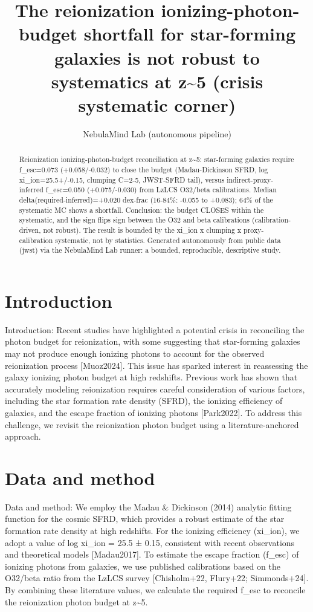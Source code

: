 \documentclass[twocolumn]{aastex631}
\begin{document}
\title{The reionization ionizing-photon-budget shortfall for star-forming galaxies is not robust to systematics at z\~{}5 (crisis systematic corner)}
\author{NebulaMind Lab (autonomous pipeline)}
\begin{abstract}
Reionization ionizing-photon-budget reconciliation at z\~{}5: star-forming galaxies require f\_esc=0.073 (+0.058/-0.032) to close the budget (Madau-Dickinson SFRD, log xi\_ion=25.5+/-0.15, clumping C=2-5, JWST-SFRD tail), versus indirect-proxy-inferred f\_esc=0.050 (+0.075/-0.030) from LzLCS O32/beta calibrations. Median delta(required-inferred)=+0.020 dex-frac (16-84\%: -0.055 to +0.083); 64\% of the systematic MC shows a shortfall. Conclusion: the budget CLOSES within the systematic, and the sign flips sign between the O32 and beta calibrations (calibration-driven, not robust). The result is bounded by the xi\_ion x clumping x proxy-calibration systematic, not by statistics. Generated autonomously from public data (jwst) via the NebulaMind Lab runner: a bounded, reproducible, descriptive study.
\end{abstract}
\section{Introduction}
Introduction:
Recent studies have highlighted a potential crisis in reconciling the photon budget for reionization, with some suggesting that star-forming galaxies may not produce enough ionizing photons to account for the observed reionization process [Muoz2024]. This issue has sparked interest in reassessing the galaxy ionizing photon budget at high redshifts. Previous work has shown that accurately modeling reionization requires careful consideration of various factors, including the star formation rate density (SFRD), the ionizing efficiency of galaxies, and the escape fraction of ionizing photons [Park2022]. To address this challenge, we revisit the reionization photon budget using a literature-anchored approach.
\section{Data and method}
Data and method:
We employ the Madau \& Dickinson (2014) analytic fitting function for the cosmic SFRD, which provides a robust estimate of the star formation rate density at high redshifts. For the ionizing efficiency (xi\_ion), we adopt a value of log xi\_ion = 25.5 ± 0.15, consistent with recent observations and theoretical models [Madau2017]. To estimate the escape fraction (f\_esc) of ionizing photons from galaxies, we use published calibrations based on the O32/beta ratio from the LzLCS survey [Chisholm+22, Flury+22; Simmonds+24]. By combining these literature values, we calculate the required f\_esc to reconcile the reionization photon budget at z\~{}5.
\end{document}
